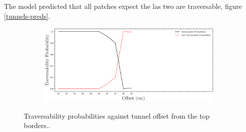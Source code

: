 \documentclass[../document.tex]{subfiles}
\begin{document}
The model predicted that all patches expect the las two are traversable, figure \ref{tunnels-preds}. 
\begin{figure}[htbp]
    \centering
\begin{subfigure}[b]{1\textwidth}
    \includegraphics[width=\linewidth]{../img/5/custom_patches/tunnel/predictions.png}
    \end{subfigure}
    \caption{Traversability probabilities against tunnel offset from the top borders..}
    \label{fig: tunnels-preds}
\end{figure}
\end{document}
